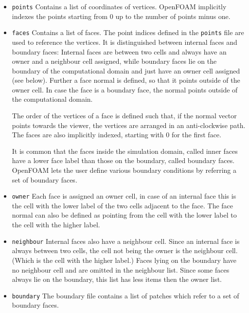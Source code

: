 \begin{itemize}

	\item \verb+points+ Contains a list of coordinates of vertices. OpenFOAM implicitly indexes the points starting from 0 up to the number of points minus one.

	\item \verb+faces+ Contains a list of faces. The point indices defined in the \verb+points+ file are used to reference the vertices. It is distinguished between internal faces and boundary faces: Internal faces are between two cells and always have an owner and a neighbour cell assigned, while boundary faces lie on the boundary of the computational domain and just have an owner cell assigned (see below). Further a face normal is defined, so that it points outside of the owner cell. In case the face is a boundary face, the normal points outside of the computational domain.

The order of the vertices of a face is defined such that, if the normal vector points towards the viewer, the vertices are arranged in an anti-clockwise path. The faces are also implicitly indexed, starting with 0 for the first face.

It is common that the faces inside the simulation domain, called inner faces have a lower face label than those on the boundary, called boundary faces. OpenFOAM lets the user define various boundary conditions by referring a set of boundary faces.

	\item \verb+owner+ Each face is assigned an owner cell, in case of an internal face this is the cell with the lower label of the two cells adjacent to the face. The face normal can also be defined as pointing from the cell with the lower label to the cell with the higher label.

	\item \verb+neighbour+ Internal faces also have a neighbour cell. Since an internal face is always between two cells, the cell not being the owner is the neighbour cell. (Which is the cell with the higher label.) Faces lying on the boundary have no neighbour cell and are omitted in the neighbour list. Since some faces always lie on the boundary, this list has less items then the owner list.

	\item \verb+boundary+ The boundary file contains a list of patches which refer to a set of boundary faces.
	
\end{itemize}

